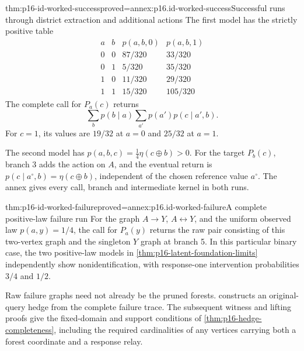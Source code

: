 \begin{hbtheorem}{thm:p16-id-worked-success}{proved=annex:p16.id-worked-success}{Successful runs through district extraction and additional actions}
The first model has the strictly positive table
\[
\begin{array}{cc|cc}
 a&b&p(a,b,0)&p(a,b,1)\\\hline
 0&0&87/320&33/320\\
 0&1&5/320&35/320\\
 1&0&11/320&29/320\\
 1&1&15/320&105/320
\end{array}
\]
The complete call for \(P_a(c)\) returns
\[
 \sum_b p(b\mid a)\sum_{a'}p(a')p(c\mid a',b).
\]
For \(c=1\), its values are \(19/32\) at \(a=0\) and
\(25/32\) at \(a=1\).

The second model has \(p(a,b,c)=\frac14\eta(c\oplus b)>0\).
For the target \(P_b(c)\), branch 3 adds the action on \(A\),
and the eventual return is \(p(c\mid a^\circ,b)=\eta(c\oplus b)\),
independent of the chosen reference value \(a^\circ\).
The annex gives every call, branch and intermediate kernel in both runs.
\end{hbtheorem}

\begin{hbtheorem}{thm:p16-id-worked-failure}{proved=annex:p16.id-worked-failure}{A complete positive-law failure run}
For the graph \(A\to Y\), \(A\leftrightarrow Y\), and
the uniform observed law \(p(a,y)=1/4\), the call for \(P_a(y)\)
returns the raw pair consisting of this two-vertex graph and the
singleton \(Y\) graph at branch 5. In this particular binary case,
the two positive-law models in
\cref{thm:p16-latent-foundation-limits} independently show
nonidentification, with response-one intervention probabilities
\(3/4\) and \(1/2\).
\end{hbtheorem}

Raw failure graphs need not already be the pruned forests.
 constructs an original-query
hedge from the complete failure trace. The subsequent witness and
lifting proofs give the fixed-domain and support conditions of
\cref{thm:p16-hedge-completeness}, including the required cardinalities
of any vertices carrying both a forest coordinate and a response relay.
